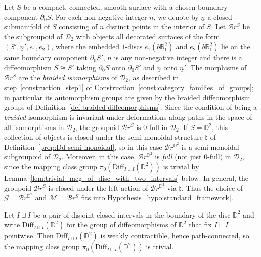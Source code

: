 \documentclass[AHL,Unicode,published]{cedram}
\newcommand{\Diff}{\mathrm{Diff}}
\newcommand{\cB}{\mathcal{B}}
\newcommand{\cD}{\mathcal{D}}
\newcommand{\cG}{\mathcal{G}}
\newcommand{\cM}{\mathcal{M}}
\newcommand{\bB}{\mathbb{B}}
\newcommand{\bD}{\mathbb{D}}
\begin{document}
Let $S$ be a compact, connected, smooth surface with a chosen boundary component $\partial_{0} S$. For each non-negative integer $n$, we denote by $\underline{n}$ a closed submanifold of $S$ consisting of $n$ distinct points in the interior of $S$. Let $\cB r^S$ be the subgroupoid of $\cD_{2}$ with objects all decorated surfaces of the form $(S',\underline{n}',e_{1},e_{2})$, where the embedded $1$-discs $e_{1}(b\bB^2_{1})$ and $e_{2}(b\bB^2_{1})$ lie on the same boundary component $\partial_{0} S'$, $n$ is any non-negative integer and there is a diffeomorphism $S \cong S'$ taking $\partial_{0} S$ onto $\partial_{0} S'$ and $\underline{n}$ onto $\underline{n}'$. The morphisms of $\cB r^S$ are the \emph{braided isomorphisms} of $\cD_{2}$, as described in step~\ref{construction_step1} of Construction~\ref{const:category_families_of_groups}; in particular its automorphism groups are given by the braided diffeomorphism groups of Definition~\ref{def:braided-diffeomorphisms}. Since the condition of being a \emph{braided} isomorphism is invariant under deformations along paths in the space of all isomorphisms in $\cD_{2}$, the groupoid $\cB r^S$ is $0$-full in $\cD_{2}$. If $S=\bD^{2}$, this collection of objects is closed under the semi-monoidal structure $\natural$ of Definition~\ref{prop:Dd-semi-monoidal}, so in this case $\cB r^{\bD^{2}}$ is a semi-monoidal subgroupoid of $\cD_{2}$. Moreover, in this case, $\cB r^{\bD^{2}}$ is \emph{full} (not just $0$-full) in $\cD_{2}$, since the mapping class group $\pi_{0}(\Diff_{I \sqcup I}(\bD^{2}))$ is trivial by Lemma~\ref{lem:trivial_mcg_of_disc_with_two_intervals} below. In general, the groupoid $\cB r^S$ is closed under the left action of $\cB r^{\bD^{2}}$ via $\natural$. Thus the choice of $\cG = \cB r^{\bD^{2}}$ and $\cM = \cB r^S$ fits into Hypothesis~\ref{hypo:standard_framework}.

\begin{lemm}\label{lem:trivial_mcg_of_disc_with_two_intervals}
Let $I \sqcup I$ be a pair of disjoint closed intervals in the boundary of the disc $\bD^{2}$ and write $\Diff_{I \sqcup I}(\bD^{2})$ for the group of diffeomorphisms of $\bD^{2}$ that fix $I \sqcup I$ pointwise. Then $\Diff_{I \sqcup I}(\bD^{2})$ is weakly contractible, hence path-connected, so the mapping class group $\pi_{0}(\Diff_{I \sqcup I}(\bD^{2}))$ is trivial.
\end{lemm}
\end{document}

